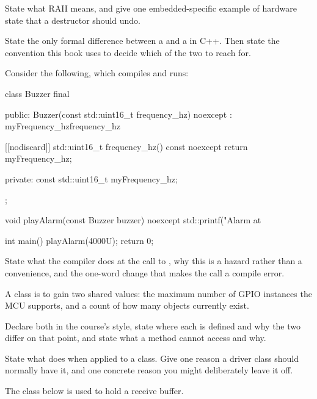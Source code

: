  State what RAII means, and give one embedded-specific example of hardware state that a
destructor should undo. 

\label{exa:q:3}

 State the only formal difference between a  and a  in C++. Then
state the convention this book uses to decide which of the two to reach for. 

 Consider the following, which compiles and runs:

\begin{cppcode}
class Buzzer final
{
public:
    Buzzer(const std::uint16_t frequency_hz) noexcept
        : myFrequency_hz{frequency_hz}
    {}

    [[nodiscard]] std::uint16_t frequency_hz() const noexcept { return myFrequency_hz; }

private:
    const std::uint16_t myFrequency_hz;
};

void playAlarm(const Buzzer buzzer) noexcept
{
    std::printf("Alarm at %
}

int main()
{
    playAlarm(4000U);
    return 0;
}
\end{cppcode}

\noindent State what the compiler does at the call to , why this is a hazard rather
than a convenience, and the one-word change that makes the call a compile error. 

 A  class is to gain two shared values: the maximum number of GPIO instances the
MCU supports, and a count of how many  objects currently exist.

Declare both in the course's style, state where each is defined and why the two differ on that
point, and state what a  method cannot access and why. 

 State what  does when applied to a class. Give one reason a driver class
should normally have it, and one concrete reason you might deliberately leave it off. 

\label{exa:q:4}

The class below is used to hold a receive buffer.

